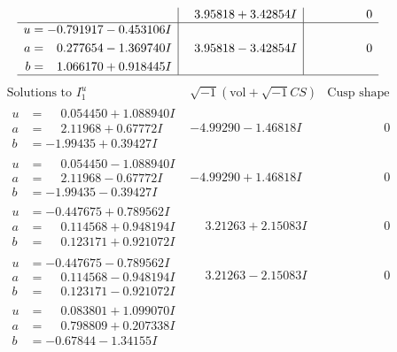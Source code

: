 \documentclass[1p]{elsarticle_modified}
\theoremstyle{definition}
\newcommand{\I}{\sqrt{-1}}
\begin{document}
$$\begin{array}{c|c|c}
 & \phantom{-}3.95818 + 3.42854 I & \phantom{-0.000000 } 0 \\ \hline\begin{aligned}
u &= -0.791917 - 0.453106 I \\
a &= \phantom{-}0.277654 - 1.369740 I \\
b &= \phantom{-}1.066170 + 0.918445 I\end{aligned}
 & \phantom{-}3.95818 - 3.42854 I & \phantom{-0.000000 } 0\\
 \hline 
 \end{array}$$\newpage$$\begin{array}{c|c|c}  
\text{Solutions to }I^u_{1}& \I (\text{vol} + \sqrt{-1}CS) & \text{Cusp shape}\\
 \hline 
\begin{aligned}
u &= \phantom{-}0.054450 + 1.088940 I \\
a &= \phantom{-}2.11968 + 0.67772 I \\
b &= -1.99435 + 0.39427 I\end{aligned}
 & -4.99290 - 1.46818 I & \phantom{-0.000000 } 0 \\ \hline\begin{aligned}
u &= \phantom{-}0.054450 - 1.088940 I \\
a &= \phantom{-}2.11968 - 0.67772 I \\
b &= -1.99435 - 0.39427 I\end{aligned}
 & -4.99290 + 1.46818 I & \phantom{-0.000000 } 0 \\ \hline\begin{aligned}
u &= -0.447675 + 0.789562 I \\
a &= \phantom{-}0.114568 + 0.948194 I \\
b &= \phantom{-}0.123171 + 0.921072 I\end{aligned}
 & \phantom{-}3.21263 + 2.15083 I & \phantom{-0.000000 } 0 \\ \hline\begin{aligned}
u &= -0.447675 - 0.789562 I \\
a &= \phantom{-}0.114568 - 0.948194 I \\
b &= \phantom{-}0.123171 - 0.921072 I\end{aligned}
 & \phantom{-}3.21263 - 2.15083 I & \phantom{-0.000000 } 0 \\ \hline\begin{aligned}
u &= \phantom{-}0.083801 + 1.099070 I \\
a &= \phantom{-}0.798809 + 0.207338 I \\
b &= -0.67844 - 1.34155 I\end{aligned}

\end{array}$$
\end{document}
